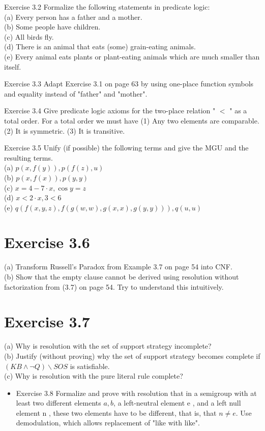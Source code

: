 \documentclass[10pt]{article}
\begin{document}
Exercise 3.2 Formalize the following statements in predicate logic:\\
(a) Every person has a father and a mother.\\
(b) Some people have children.\\
(c) All birds fly.\\
(d) There is an animal that eats (some) grain-eating animals.\\
(e) Every animal eats plants or plant-eating animals which are much smaller than itself.

Exercise 3.3 Adapt Exercise 3.1 on page 63 by using one-place function symbols and equality instead of "father" and "mother".

Exercise 3.4 Give predicate logic axioms for the two-place relation " $<$ " as a total order. For a total order we must have (1) Any two elements are comparable. (2) It is symmetric. (3) It is transitive.

Exercise 3.5 Unify (if possible) the following terms and give the MGU and the resulting terms.\\
(a) $p(x, f(y)), p(f(z), u)$\\
(b) $p(x, f(x)), p(y, y)$\\
(c) $x=4-7 \cdot x, \cos y=z$\\
(d) $x<2 \cdot x, 3<6$\\
(e) $q(f(x, y, z), f(g(w, w), g(x, x), g(y, y))), q(u, u)$

\section*{Exercise 3.6}
(a) Transform Russell's Paradox from Example 3.7 on page 54 into CNF.\\
(b) Show that the empty clause cannot be derived using resolution without factorization from (3.7) on page 54. Try to understand this intuitively.

\section*{Exercise 3.7}
(a) Why is resolution with the set of support strategy incomplete?\\
(b) Justify (without proving) why the set of support strategy becomes complete if $(K B \wedge \neg Q) \backslash S O S$ is satisfiable.\\
(c) Why is resolution with the pure literal rule complete?

\begin{itemize}
  \item Exercise 3.8 Formalize and prove with resolution that in a semigroup with at least two different elements $a, b$, a left-neutral element e , and a left null element n , these two elements have to be different, that is, that $n \neq e$. Use demodulation, which allows replacement of "like with like".
\end{itemize}
\end{document}
